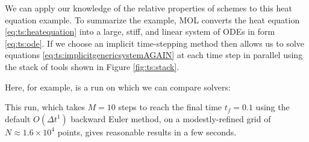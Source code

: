 We can apply our knowledge of the relative properties of schemes to this heat equation example.  To summarize the example, MOL converts the heat equation \eqref{eq:ts:heatequation} into a large, stiff, and linear system of ODEs in form \eqref{eq:ts:ode}.  If we choose an implicit time-stepping method then \PETSc allows us to solve equations \eqref{eq:ts:implicitgenericsystemAGAIN} at each time step in parallel using the stack of tools shown in Figure \ref{fig:ts:stack}.

Here, for example, is a run on which we can compare solvers:
This run, which takes $M=10$ steps to reach the final time $t_f=0.1$ using the default $O(\Delta t^1)$ backward Euler method, on a modestly-refined grid of $N  ^4$ points, gives reasonable results in a few seconds. %

